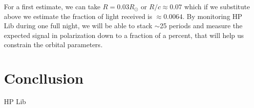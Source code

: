 \documentclass[12pt,a4paper,oneside]{book}
\begin{document}
For a first estimate, we can take $R = 0.03R_\odot$ or $R/c \approx           
0.07$ which if we substitute above we estimate the fraction of light
received is $\approx 0.0064$. By monitoring HP Lib during one full 
night, we will be able to stack $\sim$25 periods and measure the
expected signal in polarization down to a fraction of a percent, that will help us 
constrain the orbital parameters. 


\section*{Concllusion}
HP Lib


\begin{thebibliography}{99}
\end{thebibliography}
\end{document}
